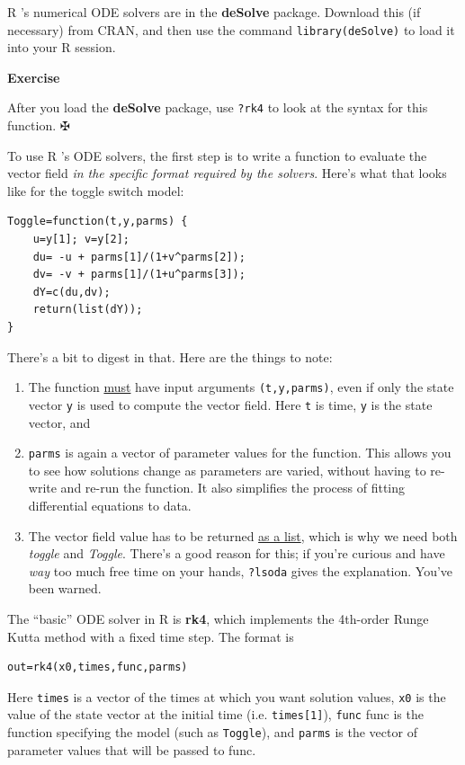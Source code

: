\documentclass [11pt]{article}
\newcommand{\blst}{\vspace{-0.035in} \begin{lstlisting}}
\newcommand{\ttt}[1]{\texttt{#1}}
\newcounter{exercise}
\numberwithin{exercise}{section}
\newcommand{\exnumber}{\addtocounter{exercise}{1} \theexercise \thinspace}
\def\R{R }
\begin{document}
\R's numerical ODE solvers are in the \textbf{deSolve} package. Download this (if necessary) from
CRAN, and then use the command \ttt{library(deSolve)} to load it into your \R session.   

{\bf Exercise \exnumber} After you load the \textbf{deSolve} package, use \ttt{?rk4} to look at the 
syntax for this function.  $\maltese$ 

To use \R's ODE solvers, the first step is to write a function to evaluate 
the vector field \textit{in the specific format required by the solvers}. Here's what that looks like
for the toggle switch model:
\blst
Toggle=function(t,y,parms) {
    u=y[1]; v=y[2];
    du= -u + parms[1]/(1+v^parms[2]);
    dv= -v + parms[1]/(1+u^parms[3]);
    dY=c(du,dv); 
    return(list(dY)); 
}
\end{lstlisting} 
There's a bit to digest in that. Here are the things to note:
\begin{enumerate}
\vspace*{-0.12in}
\item The function \underline{must} have input arguments \ttt{(t,y,parms)}, even if only the state
vector \ttt{y} is used to compute the vector field. Here \ttt{t} is time, \ttt{y} is the state vector,
and \item \ttt{parms} is again a vector of parameter values for the function. This allows you to
see how solutions change as parameters are varied, without having to re-write and re-run the function. It also simplifies
the process of fitting differential equations to data. 
\item The vector field value has to be returned \underline{as a list}, which is why we need both
\textit{toggle} and \textit{Toggle}. There's a good reason for this;
if you're curious and have \textit{way} too much free time on your hands, \ttt{?lsoda} gives  
the explanation. You've been warned.  
\end{enumerate} 

The ``basic'' ODE solver in \R is \textbf{rk4}, which implements the 4th-order Runge
Kutta method with a fixed time step. The format is 
\blst 
out=rk4(x0,times,func,parms) 
\end{lstlisting}
Here \ttt{times} is a vector of the times at which you want solution values, 
\ttt{x0} is the value of the state vector at the initial time (i.e. \ttt{times[1]}), 
\ttt{func} func is the function specifying the model (such as \ttt{Toggle}),
and \ttt{parms} is the vector of parameter values that will be passed to func. 
\end{document}
